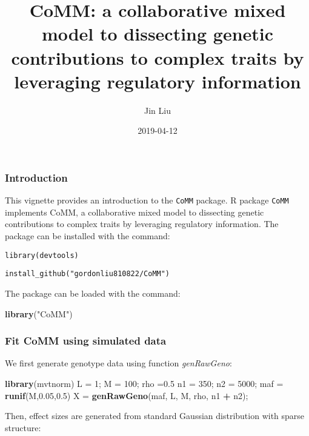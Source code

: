 \documentclass[]{article}
\title{CoMM: a collaborative mixed model to dissecting genetic contributions to
complex traits by leveraging regulatory information}
\author{Jin Liu}
\date{2019-04-12}
\newenvironment{Shaded}{\begin{snugshade}}{\end{snugshade}}
\newcommand{\KeywordTok}[1]{\textcolor[rgb]{0.13,0.29,0.53}{\textbf{#1}}}
\newcommand{\DecValTok}[1]{\textcolor[rgb]{0.00,0.00,0.81}{#1}}
\newcommand{\FloatTok}[1]{\textcolor[rgb]{0.00,0.00,0.81}{#1}}
\newcommand{\StringTok}[1]{\textcolor[rgb]{0.31,0.60,0.02}{#1}}
\newcommand{\OperatorTok}[1]{\textcolor[rgb]{0.81,0.36,0.00}{\textbf{#1}}}
\newcommand{\NormalTok}[1]{#1}
\begin{document}
\maketitle

\subsubsection{Introduction}\label{introduction}

This vignette provides an introduction to the \texttt{CoMM} package. R
package \texttt{CoMM} implements CoMM, a collaborative mixed model to
dissecting genetic contributions to complex traits by leveraging
regulatory information. The package can be installed with the command:

\texttt{library(devtools)}

\texttt{install\_github("gordonliu810822/CoMM")}

The package can be loaded with the command:

\begin{Shaded}
\begin{Highlighting}[]
\KeywordTok{library}\NormalTok{(}\StringTok{"CoMM"}\NormalTok{)}
\end{Highlighting}
\end{Shaded}

\subsubsection{Fit CoMM using simulated
data}\label{fit-comm-using-simulated-data}

We first generate genotype data using function \emph{genRawGeno}:

\begin{Shaded}
\begin{Highlighting}[]
\KeywordTok{library}\NormalTok{(mvtnorm)}
\NormalTok{L =}\StringTok{ }\DecValTok{1}\NormalTok{; M =}\StringTok{ }\DecValTok{100}\NormalTok{; rho =}\FloatTok{0.5}
\NormalTok{n1 =}\StringTok{ }\DecValTok{350}\NormalTok{; n2 =}\StringTok{ }\DecValTok{5000}\NormalTok{;}
\NormalTok{maf =}\StringTok{ }\KeywordTok{runif}\NormalTok{(M,}\FloatTok{0.05}\NormalTok{,}\FloatTok{0.5}\NormalTok{)}
\NormalTok{X =}\StringTok{ }\KeywordTok{genRawGeno}\NormalTok{(maf, L, M, rho, n1 }\OperatorTok{+}\StringTok{ }\NormalTok{n2);}
\end{Highlighting}
\end{Shaded}

Then, effect sizes are generated from standard Gaussian distribution
with sparse structure:
\end{document}
